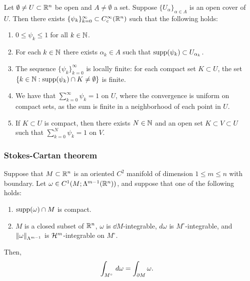 \documentclass[a4paper]{article}
\renewcommand{\suminfk}{\sum_{k=0}^\infty}
\renewcommand{\seqinfk}[1]{\{ #1 \}_{k=0}^\infty}
\renewcommand{\sumk}{\sum_{k=0}}
\begin{document}
\begin{thm}
Let $\emptyset \neq U \subset \mathbb{R}^n$ be open and $A \neq 
\emptyset$ a set. Suppose $\{U_\alpha\}_{\alpha \in A}$
is an open cover of $U$. Then there exists 
$\seqinfk{\psi_k} \subset C_c^\infty (\R^n)$ such that 
the following holds: 
\begin{enumerate}
\item $0 \leq \psi_k \leq 1$ for all $k \in \mathbb{N}$. 

\item For each $k \in \mathbb{N}$ there exists $\alpha_k \in A$
such that $\operatorname{supp} (\psi_k) \subset U_{\alpha_k}$.

\item The sequence $\seqinfk{\psi_k}$ is locally finite: 
for each compact set $K \subset U$, the set 
$\{k \in \mathbb{N}: \operatorname{supp}(\psi_k) \cap K \neq \emptyset\}$
is finite.

\item We have that $\suminfk \psi_k = 1$
on $U$, where the convergence is uniform on compact sets, as
the sum is finite in a neighborhood of each point in $U$.

\item If $K \subset U$ is compact, then there exists $N \in \mathbb{N}$
and an open set $K \subset V \subset U$ such that 
$\sumk^N \psi_k = 1$ on $V$.
\end{enumerate}
\end{thm}

\subsubsection{Stokes-Cartan theorem}

\begin{thm}
Suppose that $M \subset \mathbb{R}^n$ is an oriented $C^2$ manifold
of dimension $1 \leq m \leq n$ with boundary. Let $\omega
\in C^1 (M; \Lambda^{m-1} (\mathbb{R}^n))$, and suppose that one of
the following holds:
\begin{enumerate}
  \item $\operatorname{supp} (\omega) \cap M$ is compact.
  \item $M$ is a closed subset of $\mathbb{R}^n$, $\omega$ is
  $\dd M$-integrable, $d \omega$ is $M^\circ$-integrable,
  and $\left\lVert \omega\right\rVert_{\Lambda^{m-1}}$ is $\mathcal{H}^m$-integrable
  on $M^\circ$.
\end{enumerate}
Then,
\[
\int_{M^\circ} \, d \omega = \int_{\partial M} \omega.
\]
\end{thm}
\end{document}
